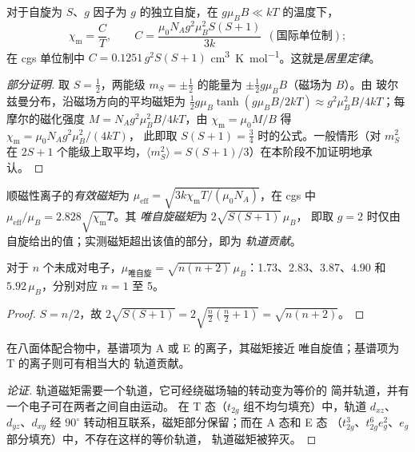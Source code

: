 \begin{theorem}[居里定律]\label{thm:b3:complex-spectra-magnetism:curie}
对于自旋为 $S$、$g$ 因子为 $g$ 的独立自旋，在 $g\mu_BB \ll kT$ 的温度下，
\[
  \chi_{\mathrm m} = \frac{C}{T}, \qquad C = \frac{\mu_0N_Ag^2\mu_B^2S(S+1)}{3k}\ \ (\text{国际单位制});
\]
在 cgs 单位制中 $C = 0.1251\,g^2S(S+1)$ \unit{cm^3.K.mol^{-1}}。这就是\emph{居里定律}。
\end{theorem}

\begin{proof}[部分证明]
取 $S = \frac12$，两能级 $m_S = \pm\frac12$ 的能量为 $\pm\frac12g\mu_BB$（磁场为 $B$）。由
玻尔兹曼分布，沿磁场方向的平均磁矩为 $\frac12g\mu_B\tanh(g\mu_BB/2kT) \approx
g^2\mu_B^2B/4kT$；每摩尔的磁化强度 $M = N_Ag^2\mu_B^2B/4kT$，由 $\chi_{\mathrm m} = \mu_0M/B$ 得 $\chi_{\mathrm m} = \mu_0N_Ag^2\mu_B^2/(4kT)$，
此即取 $S(S+1) = \frac34$ 时的公式。一般情形（对 $m_S^2$ 在 $2S + 1$
个能级上取平均，$\langle m_S^2\rangle = S(S+1)/3$）在本阶段不加证明地承认。
\end{proof}

\begin{definition}[有效磁矩]\label{def:b3:complex-spectra-magnetism:moment}
顺磁性离子的\emph{有效磁矩}为
$\mu_{\mathrm{eff}} = \sqrt{3k\chi_{\mathrm m}T/(\mu_0N_A)}$，在 cgs 中 $\mu_{\mathrm{eff}}/\mu_B = 2.828\sqrt{\chi_{\mathrm m}T}$。其
\emph{唯自旋磁矩}为 $2\sqrt{S(S+1)}\,\mu_B$，
即取 $g = 2$ 时仅由自旋给出的值；实测磁矩超出该值的部分，即为
\emph{轨道贡献}。
\end{definition}

\begin{proposition}[唯自旋公式]\label{prop:b3:complex-spectra-magnetism:spin-only}
对于 $n$ 个未成对电子，$\mu_{\text{唯自旋}} = \sqrt{n(n+2)}\,\mu_B$：1.73、2.83、3.87、4.90 和 $5.92\,\mu_B$，分别对应
$n = 1$ 至 5。
\end{proposition}

\begin{proof}
$S = n/2$，故 $2\sqrt{S(S+1)} = 2\sqrt{\frac n2(\frac n2 + 1)} = \sqrt{n(n+2)}$。
\end{proof}

\begin{proposition}[轨道贡献]\label{prop:b3:complex-spectra-magnetism:orbital-contribution}
在八面体配合物中，基谱项为 A 或 E 的离子，其磁矩接近
唯自旋值；基谱项为 T 的离子则可有相当大的
轨道贡献。
\end{proposition}

\begin{proof}[论证]
轨道磁矩需要一个轨道，它可经绕磁场轴的转动变为等价的
简并轨道，并有一个电子可在两者之间自由运动。
在 T 态（$t_{2g}$ 组不均匀填充）中，轨道 $d_{xz}$、$d_{yz}$、$d_{xy}$
经 $90^\circ$ 转动相互联系，磁矩部分保留；而在 A 态和 E 态
（$t_{2g}^3$、$t_{2g}^6e_g^2$、$e_g$ 部分填充）中，不存在这样的等价轨道，
轨道磁矩被猝灭。
\end{proof}

